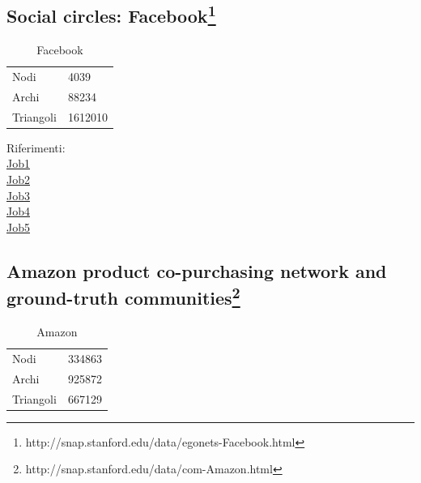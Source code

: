 \documentclass[paper=a4, fontsize=11pt]{scrartcl}	%
\numberwithin{equation}{section}															%
\numberwithin{figure}{section}																%
\numberwithin{table}{section}																%
\begin{document}
\subsection{Social circles: Facebook\protect\footnote{http://snap.stanford.edu/data/egonets-Facebook.html}} 
\protect\begin{table}[]
	\centering
	\caption{Facebook}
	\label{my-label}
	\begin{tabular}{ll}
		Nodi		 & 4039 \\
		Archi		 & 88234 \\
		Triangoli	& 1612010 \\
	\end{tabular}
\end{table}
Riferimenti:\\	
\href{http://hadoop-compute0.di.univr.it:50030/jobdetails.jsp?jobid=job_201603141010_12286}{Job1}\\
\href{http://hadoop-compute0.di.univr.it:50030/jobdetails.jsp?jobid=job_201603141010_12287}{Job2}\\
\href{http://hadoop-compute0.di.univr.it:50030/jobdetails.jsp?jobid=job_201603141010_12288}{Job3}\\
\href{http://hadoop-compute0.di.univr.it:50030/jobdetails.jsp?jobid=job_201603141010_12289}{Job4}\\
\href{http://hadoop-compute0.di.univr.it:50030/jobdetails.jsp?jobid=job_201603141010_12290}{Job5}\\

\subsection{Amazon product co-purchasing network and ground-truth communities\protect\footnote{http://snap.stanford.edu/data/com-Amazon.html}} 
\protect\begin{table}[]
	\centering
	\caption{Amazon}
	\label{my-label}
	\begin{tabular}{ll}
		Nodi		 & 334863 \\
		Archi		 & 925872 \\
		Triangoli	& 667129 \\
	\end{tabular}
\end{table}
\end{document}
